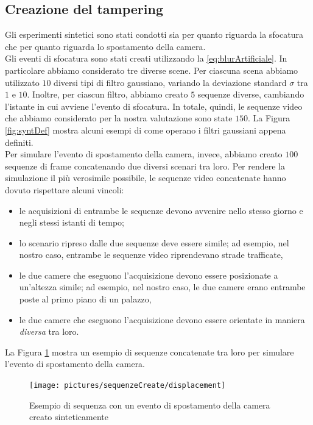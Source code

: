 \subsection{Creazione del tampering}
Gli esperimenti sintetici sono stati condotti sia per quanto riguarda la sfocatura che per quanto riguarda lo spostamento della camera.\\
Gli eventi di sfocatura sono stati creati utilizzando la \eqref{eq:blurArtificiale}.
In particolare abbiamo considerato tre diverse scene.
Per ciascuna scena abbiamo utilizzato $10$ diversi tipi di filtro gaussiano, variando la deviazione standard $\sigma$ tra $1$ e $10$.
Inoltre, per ciascun filtro, abbiamo creato $5$ sequenze diverse, cambiando l'istante in cui avviene l'evento di sfocatura.
In totale, quindi, le sequenze video che abbiamo considerato per la nostra valutazione sono state $150$.
La Figura \ref{fig:syntDef} mostra alcuni esempi di come operano i filtri gaussiani appena definiti.\\
Per simulare l'evento di spostamento della camera, invece, abbiamo creato $100$ sequenze di frame concatenando due diversi scenari tra loro.
Per rendere la simulazione il pi\`u verosimile possibile, le sequenze video concatenate hanno dovuto rispettare alcuni vincoli:
\begin{itemize}
	\item le acquisizioni di entrambe le sequenze devono avvenire nello stesso giorno e negli stessi istanti di tempo;
	\item lo scenario ripreso dalle due sequenze deve essere simile; ad esempio, nel nostro caso, entrambe le sequenze video riprendevano strade trafficate,
	\item le due camere che eseguono l'acquisizione devono essere posizionate a un'altezza simile; ad esempio, nel nostro caso, le due camere erano entrambe poste al primo piano di un palazzo,
	\item le due camere che eseguono l'acquisizione devono essere orientate in maniera \textit{diversa} tra loro.
\end{itemize}
La Figura \ref{fig:syntDispl} mostra un esempio di sequenze concatenate tra loro per simulare l'evento di spostamento della camera.
\begin{figure}[tb]
	\centering
	\texttt{[image: pictures/sequenzeCreate/displacement]}
	\caption{Esempio di sequenza con un evento di spostamento della camera creato sinteticamente}
	\label{fig:syntDispl}
\end{figure}
